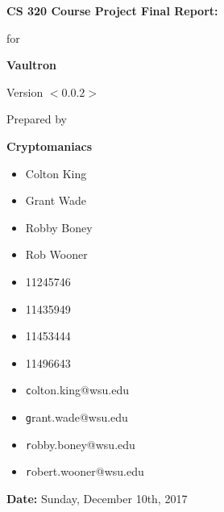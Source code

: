 \documentclass[11pt]{report}
\begin{document}

{\Huge \textbf{CS 320 Course Project Final Report:}}
\vspace{5mm}
\begin{flushright}

    {\huge for}
    \vspace{20mm}

    \textbf{\Huge Vaultron}
    \vspace{20mm}

    {\huge Version $<0.0.2>$}
    \vspace{20mm}

    {\huge Prepared by}
    \vspace{20mm}

    \textbf{\huge Cryptomaniacs}
    \vspace{20mm}
\end{flushright}

\begin{multicols}{3}
    \noindent
    \begin{itemize}
        \item[] {\Large Colton King}
        \item[] {\Large Grant Wade}
        \item[] {\Large Robby Boney}
        \item[] {\Large Rob Wooner}
    \end{itemize}

    \begin{itemize}
        \item[] {\Large 11245746}
        \item[] {\Large 11435949}
        \item[] {\Large 11453444}
        \item[] {\Large 11496643}
    \end{itemize}

    \begin{itemize}
        \item[] {\Large\texttt colton.king@wsu.edu}
        \item[] {\Large\texttt grant.wade@wsu.edu}
        \item[] {\Large\texttt robby.boney@wsu.edu}
        \item[] {\Large\texttt robert.wooner@wsu.edu}
    \end{itemize}
\end{multicols}

\vfill

\begin{flushright}
    \vspace{20mm}
    {\Large \textbf{Date:} Sunday, December 10th, 2017}
\end{flushright}
\end{document}

